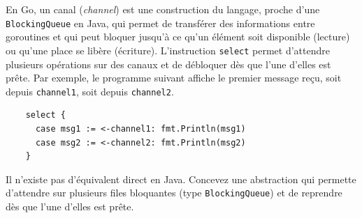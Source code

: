
\begingroup

\begin{exercice}
  \label{exo:monitors/go}

  En Go, un canal (\emph{channel}) est une construction du langage, proche d'une \texttt{BlockingQueue} en Java, 
  qui permet de transférer des informations entre goroutines et qui peut bloquer jusqu'à ce qu'un élément soit disponible 
  (lecture) ou qu'une place se libère (écriture). L'instruction \texttt{select} permet d'attendre plusieurs opérations 
  sur des canaux et de débloquer dès que l'une d'elles est prête. Par exemple, le programme suivant affiche le premier 
  message reçu, soit depuis \texttt{channel1}, soit depuis \texttt{channel2}.
 
  \begin{lstlisting}
    select {
      case msg1 := <-channel1: fmt.Println(msg1)
      case msg2 := <-channel2: fmt.Println(msg2)
    }
  \end{lstlisting}

  \begin{questions}
  \item Il n'existe pas d'équivalent direct en Java. Concevez une abstraction qui permette d'attendre
    sur plusieurs files bloquantes (type \texttt{BlockingQueue})
    et de reprendre dès que l'une d'elles est prête.
  \end{questions}

\end{exercice}

\endgroup
\endinput
